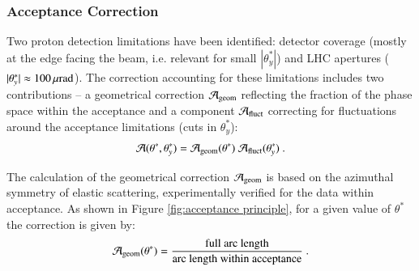 
\subsubsection{Acceptance Correction}
\label{sec:acc corr}

Two proton detection limitations have been identified: detector coverage (mostly at the edge facing the beam, i.e. relevant for small $|\theta_y^*|$) and LHC apertures ($|\theta_y^*| \approx 100\,{\rm \mu rad}$). The correction accounting for these limitations includes two contributions -- a geometrical correction ${\cal A}_{\rm geom}$ reflecting the fraction of the phase space within the acceptance and a component ${\cal A}_{\rm fluct}$ correcting for fluctuations around the acceptance limitations (cuts in $\theta_y^*$):
\begin{equation}
{\cal A}(\theta^*, \theta_y^*) = {\cal A}_{\rm geom}(\theta^*)\ {\cal A}_{\rm fluct}(\theta_y^*)\ .
\end{equation}

The calculation of the geometrical correction ${\cal A}_{\rm geom}$ is based on the azimuthal symmetry of elastic scattering, experimentally verified for the data within acceptance. As shown in Figure \ref{fig:acceptance principle}, for a given value of $\theta^*$ the correction is given by:
\begin{equation}
\label{eq:acc geom}
{\cal A_{\rm geom}}(\theta^*) = {
	\hbox{full arc length}\over 
	\hbox{arc length within acceptance}
} \ .
\end{equation}


